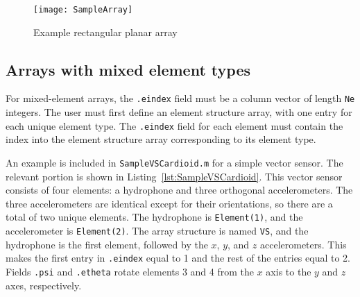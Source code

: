 \begin{figure}[!ht]
\begin{center}
\texttt{[image: SampleArray]}
\caption{\label{fig:SampleArray}Example rectangular planar array}
\end{center}
\end{figure}

\clearpage
\subsection{Arrays with mixed element types}

For mixed-element arrays, the \texttt{.eindex} field must be a column vector of length \texttt{Ne} integers. The user must first define an element structure array, with one entry for each unique element type. The \texttt{.eindex} field for each element must contain the index into the element structure array corresponding to its element type. 

An example is included in \texttt{SampleVSCardioid.m} for a simple vector sensor. The relevant portion is shown in Listing~\ref{lst:SampleVSCardioid}. This vector sensor consists of four elements: a hydrophone and three orthogonal accelerometers. The three accelerometers are identical except for their orientations, so there are a total of two unique elements. The hydrophone is \texttt{Element(1)}, and the accelerometer is \texttt{Element(2)}. The array structure is named \texttt{VS}, and the hydrophone is the first element, followed by the $x$, $y$, and $z$ accelerometers. This makes the first entry in \texttt{.eindex} equal to 1 and the rest of the entries equal to 2. Fields \texttt{.psi} and \texttt{.etheta} rotate elements 3 and 4 from the $x$ axis to the $y$ and $z$ axes, respectively.



